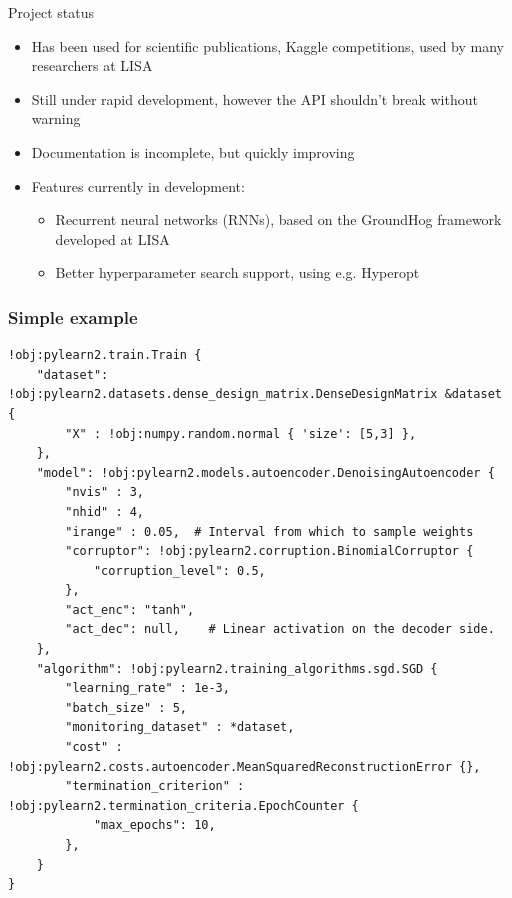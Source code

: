 \documentclass[utf8x,xcolor=pdftex,dvipsnames,table]{beamer}
\begin{document}
\begin{frame}{Project status}
  \begin{itemize}
    \item Has been used for scientific publications, Kaggle competitions, used by many researchers at LISA
    \item Still under rapid development, however the API shouldn't break without warning
    \item Documentation is incomplete, but quickly improving
    \item Features currently in development:
    \begin{itemize}
      \item Recurrent neural networks (RNNs), based on the GroundHog framework developed at LISA
      \item Better hyperparameter search support, using e.g. Hyperopt
    \end{itemize}
  \end{itemize}
\end{frame}

\begin{frame}[fragile]
  \frametitle{Simple example}

\begin{lstlisting}
!obj:pylearn2.train.Train {
    "dataset": !obj:pylearn2.datasets.dense_design_matrix.DenseDesignMatrix &dataset {
        "X" : !obj:numpy.random.normal { 'size': [5,3] },
    },
    "model": !obj:pylearn2.models.autoencoder.DenoisingAutoencoder {
        "nvis" : 3,
        "nhid" : 4,
        "irange" : 0.05,  # Interval from which to sample weights
        "corruptor": !obj:pylearn2.corruption.BinomialCorruptor {
            "corruption_level": 0.5,
        },
        "act_enc": "tanh",
        "act_dec": null,    # Linear activation on the decoder side.
    },
    "algorithm": !obj:pylearn2.training_algorithms.sgd.SGD {
        "learning_rate" : 1e-3,
        "batch_size" : 5,
        "monitoring_dataset" : *dataset,
        "cost" : !obj:pylearn2.costs.autoencoder.MeanSquaredReconstructionError {},
        "termination_criterion" : !obj:pylearn2.termination_criteria.EpochCounter {
            "max_epochs": 10,
        },
    }
}
\end{lstlisting}
\end{frame}
\end{document}
